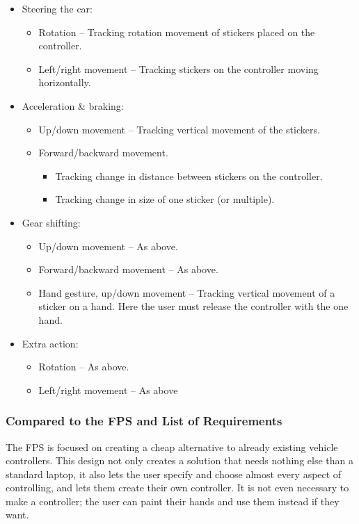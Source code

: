 \begin{itemize}
	\item Steering the car:
	\begin{itemize}
		\item Rotation – Tracking rotation movement of stickers placed on the controller.
		\item Left/right movement – Tracking stickers on the controller moving horizontally.
	\end{itemize}
	
	\item Acceleration \& braking:
	\begin{itemize}
		\item Up/down movement – Tracking vertical movement of the stickers.
		\item Forward/backward movement.
		\begin{itemize}
			\item Tracking change in distance between stickers on the controller.
			\item Tracking change in size of one sticker (or multiple).
		\end{itemize}
	\end{itemize}
	
	\item Gear shifting:
	\begin{itemize}
		\item Up/down movement – As above.
		\item Forward/backward movement – As above.
		\item Hand gesture, up/down movement – Tracking vertical movement of a sticker on a hand. Here the user must release the controller with the one hand.
	\end{itemize}
	
	\item Extra action:
	\begin{itemize}
		\item Rotation – As above.
		\item Left/right movement – As above
	\end{itemize}
\end{itemize}
\bigskip

\subsubsection*{Compared to the FPS and List of Requirements}
The FPS is focused on creating a cheap alternative to already existing vehicle controllers. This design not only creates a solution that needs nothing else than a standard laptop, it also lets the user specify and choose almost every aspect of controlling, and lets them create their own controller. It is not even necessary to make a controller; the user can paint their hands and use them instead if they want.

